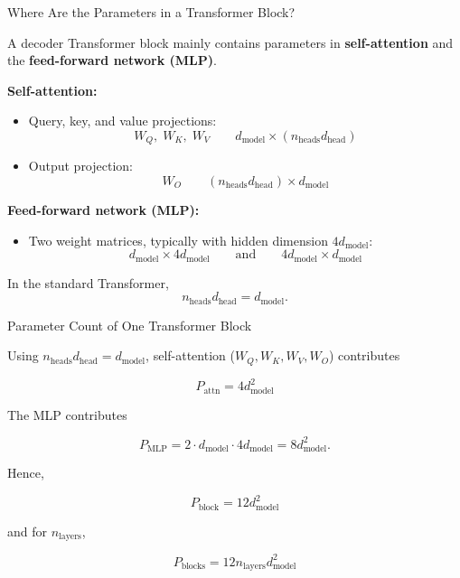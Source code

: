 \documentclass[11pt,compress,t,notes=noshow, xcolor=table]{beamer}
\begin{document}
\begin{vbframe}{Where Are the Parameters in a Transformer Block?}

\vfill

A decoder Transformer block mainly contains parameters in
\textbf{self-attention} and the \textbf{feed-forward network (MLP)}.

\textbf{Self-attention:}

\begin{itemize}
    \item Query, key, and value projections:
    \[
        W_Q,\; W_K,\; W_V
        \qquad
        d_{\text{model}} \times
        (n_{\text{heads}} d_{\text{head}})
    \]
    \item Output projection:
    \[
        W_O
        \qquad
        (n_{\text{heads}} d_{\text{head}})
        \times d_{\text{model}}
    \]
\end{itemize}

\textbf{Feed-forward network (MLP):}

\begin{itemize}
    \item Two weight matrices, typically with hidden dimension
    $4d_{\text{model}}$:
    \[
        d_{\text{model}} \times 4d_{\text{model}}
        \qquad\text{and}\qquad
        4d_{\text{model}} \times d_{\text{model}}
    \]
\end{itemize}

In the standard Transformer,
\[
    n_{\text{heads}} d_{\text{head}} = d_{\text{model}}.
\]

\vfill

\end{vbframe}



\begin{vbframe}{Parameter Count of One Transformer Block}

Using $n_{\text{heads}} d_{\text{head}} = d_{\text{model}}$, self-attention ($W_Q, W_K, W_V, W_O$) contributes

\[
P_{\text{attn}}
=
4 d_{\text{model}}^2
\]

The MLP contributes

\[
P_{\text{MLP}}
=
2 \cdot d_{\text{model}} \cdot 4d_{\text{model}}
=
8d_{\text{model}}^2.
\]

Hence,

\[
\boxed{
P_{\text{block}}
=
12d_{\text{model}}^2
}
\]

and for $n_{\text{layers}}$,

\[
\boxed{
P_{\text{blocks}}
=
12n_{\text{layers}}d_{\text{model}}^2
}
\]


\end{vbframe}
\end{document}
